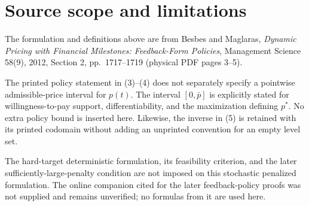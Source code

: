 \documentclass{article}
\begin{document}
\section*{Source scope and limitations}

The formulation and definitions above are from Besbes and Maglaras, \emph{Dynamic Pricing with Financial Milestones: Feedback-Form Policies}, Management Science 58(9), 2012, Section 2, pp.~1717--1719 (physical PDF pages 3--5).

The printed policy statement in (3)--(4) does not separately specify a pointwise admissible-price interval for $p(t)$. The interval $[0,\bar p]$ is explicitly stated for willingness-to-pay support, differentiability, and the maximization defining $p^*$. No extra policy bound is inserted here. Likewise, the inverse in (5) is retained with its printed codomain without adding an unprinted convention for an empty level set.

The hard-target deterministic formulation, its feasibility criterion, and the later sufficiently-large-penalty condition are not imposed on this stochastic penalized formulation. The online companion cited for the later feedback-policy proofs was not supplied and remains unverified; no formulas from it are used here.
\end{document}
